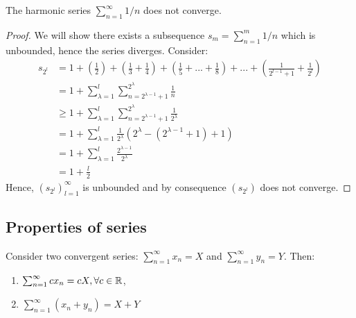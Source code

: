 \begin{theorem}
    The harmonic series $\sum_{n=1}^\infty 1/n$ does not converge.
\end{theorem}

\begin{proof}
    We will show there exists a subsequence $s_m = \sum_{n=1}^m 1/n$ which is unbounded, hence the series diverges. Consider:
    \begin{align*}
        s_{2^l} &= 1 + \left( \frac{1}{2}\right) + \left( \frac{1}{3} + \frac{1}{4}\right) +
        \left( \frac{1}{5} + ... + \frac{1}{8}\right) + ... +
        \left( \frac{1}{2^{l-1}+1} + \frac{1}{2^l}\right) \\
        &= 1 + \sum \limits_{\lambda = 1}^l \sum \limits_{n=2^{\lambda - 1} + 1}^{2^\lambda} \frac{1}{n}  \\
        &\geq 1 + \sum \limits_{\lambda = 1}^l \sum \limits_{n=2^{\lambda - 1} + 1}^{2^\lambda} \frac{1}{2^\lambda}  \\
        &= 1 + \sum \limits_{\lambda = 1}^l \frac{1}{2^\lambda}(2^\lambda - (2^{\lambda-1}+ 1) + 1) \\
        &= 1 + \sum \limits_{\lambda = 1}^l \frac{2^{\lambda-1}}{2^\lambda} \\
        &= 1 + \frac{l}{2}
    \end{align*}
    Hence, $(s_{2^l})_{l=1}^\infty$ is unbounded and by consequence $( s_{2^l})$ does not converge.
\end{proof}

\subsection{Properties of series}

\begin{theorem}
    Consider two convergent series: $\sum_{n=1}^\infty x_n = X$ and $\sum_{n=1}^\infty y_n = Y$. Then:
    \begin{enumerate}
        \item $\sum_{n=1}^\infty cx_n = cX, \forall c \in \mathbb{R}$,
        \item $\sum_{n=1}^\infty (x_n + y_n) = X + Y$
    \end{enumerate}
\end{theorem}

